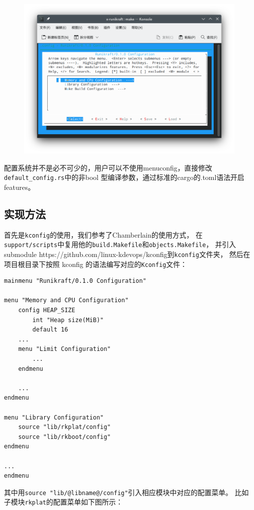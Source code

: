 \documentclass{../runikraft-report}
\begin{document}
\begin{figure}[H]
\centering
\includegraphics[width=0.8\linewidth]{../assets/runikraft-menuconfig-1.png}
\caption{}
\label{fig:runikraft-menuconfig-1}
\end{figure}

配置系统并不是必不可少的，用户可以不使用menuconfig，直接修改\texttt{default\_config.rs}中的非bool
型编译参数，通过标准的cargo的.toml语法开启features。

\subsection{实现方法}

首先是\texttt{kconfig}的使用，我们参考了Chamberlain\cite{bib:kconfig}的使用方式，
在\texttt{support/scripts}中复用他的\texttt{build.Makefile}和\texttt{objects.Makefile}，
并引入 submodule https://github.com/linux-kdevops/kconfig到\texttt{kconfig}文件夹，
然后在项目根目录下按照 kconfig 的语法编写对应的\texttt{Kconfig}文件：

\begin{lstlisting}
mainmenu "Runikraft/0.1.0 Configuration"

menu "Memory and CPU Configuration"
    config HEAP_SIZE
        int "Heap size(MiB)"
        default 16
    ...
    menu "Limit Configuration"
        ...
    endmenu

    ...
endmenu

menu "Library Configuration"
    source "lib/rkplat/config"
	source "lib/rkboot/config"
endmenu

...
endmenu
\end{lstlisting}

其中用\texttt{source "lib/@libname@/config"}引入相应模块中对应的配置菜单。
比如子模块\texttt{rkplat}的配置菜单如下图所示：
\end{document}
